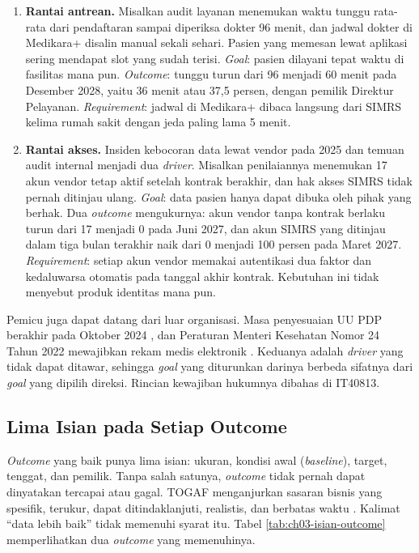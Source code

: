 \begin{enumerate}
  \item \textbf{Rantai antrean.} Misalkan audit layanan menemukan waktu tunggu
        rata-rata dari pendaftaran sampai diperiksa dokter 96 menit, dan jadwal
        dokter di Medikara+ disalin manual sekali sehari. Pasien yang memesan
        lewat aplikasi sering mendapat slot yang sudah terisi. \textit{Goal}:
        pasien dilayani tepat waktu di fasilitas mana pun. \textit{Outcome}:
        tunggu turun dari 96 menjadi 60 menit pada Desember 2028, yaitu 36 menit
        atau 37,5 persen, dengan pemilik Direktur Pelayanan.
        \textit{Requirement}: jadwal di Medikara+ dibaca langsung dari SIMRS
        kelima rumah sakit dengan jeda paling lama 5 menit.
  \item \textbf{Rantai akses.} Insiden kebocoran data lewat vendor pada 2025 dan
        temuan audit internal menjadi dua \textit{driver}. Misalkan penilaiannya
        menemukan 17 akun vendor tetap aktif setelah kontrak berakhir, dan hak
        akses SIMRS tidak pernah ditinjau ulang. \textit{Goal}: data pasien
        hanya dapat dibuka oleh pihak yang berhak. Dua \textit{outcome}
        mengukurnya: akun vendor tanpa kontrak berlaku turun dari 17 menjadi 0
        pada Juni 2027, dan akun SIMRS yang ditinjau dalam tiga bulan terakhir
        naik dari 0 menjadi 100 persen pada Maret 2027. \textit{Requirement}:
        setiap akun vendor memakai autentikasi dua faktor dan kedaluwarsa
        otomatis pada tanggal akhir kontrak. Kebutuhan ini tidak menyebut produk
        identitas mana pun.
\end{enumerate}

Pemicu juga dapat datang dari luar organisasi. Masa penyesuaian UU PDP berakhir
pada Oktober 2024 \cite{uu27-2022-pdp}, dan Peraturan Menteri Kesehatan Nomor 24
Tahun 2022 mewajibkan rekam medis elektronik \cite{permenkes24-2022}. Keduanya
adalah \textit{driver} yang tidak dapat ditawar, sehingga \textit{goal} yang
diturunkan darinya berbeda sifatnya dari \textit{goal} yang dipilih direksi.
Rincian kewajiban hukumnya dibahas di IT40813.

\subsection*{Lima Isian pada Setiap Outcome}

\textit{Outcome} yang baik punya lima isian: ukuran, kondisi awal
(\textit{baseline}), target, tenggat, dan pemilik. Tanpa salah satunya,
\textit{outcome} tidak pernah dapat dinyatakan tercapai atau gagal. TOGAF
menganjurkan sasaran bisnis yang spesifik, terukur, dapat ditindaklanjuti,
realistis, dan berbatas waktu \cite{togaf10}. Kalimat ``data lebih baik'' tidak
memenuhi syarat itu. Tabel \ref{tab:ch03-isian-outcome} memperlihatkan dua
\textit{outcome} yang memenuhinya.

